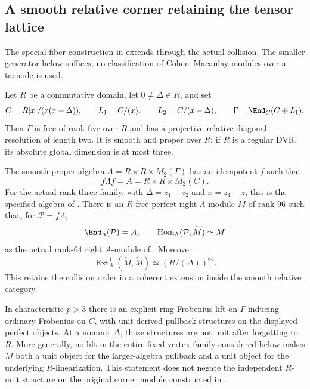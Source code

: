 \subsection{A smooth relative corner retaining the tensor lattice}
The special-fiber construction in  extends through the
actual collision. The smaller generator below suffices; no
classification of Cohen--Macaulay modules over a tacnode is used.

\begin{finding}\label{f:relativeauslander}
Let $R$ be a commutative domain, let $0\ne\Delta\in R$, and set
\[
 C=R[x]/(x(x-\Delta)),\qquad L_1=C/(x),\qquad
 L_2=C/(x-\Delta),\qquad
 \Gamma=\End_C(C\oplus L_1).
\]
Then $\Gamma$ is free of rank five over $R$ and has a projective
relative diagonal resolution of length two. It is smooth and
proper over $R$; if $R$ is a regular DVR, its absolute global
dimension is at most three.

The smooth proper algebra
$\Lambda=R\times R\times M_2(\Gamma)$ has an idempotent $f$ such that
\[
 f\Lambda f=A=R\times R\times M_2(C).
\]
For the actual rank-three family, with $\Delta=z_1-z_2$ and
$x=z_1-z$, this is the specified algebra of . There is an
$R$-free perfect right $\Lambda$-module $\widetilde M$ of rank
$96$ such that, for $\mathcal P=f\Lambda$,
\[
 \End_\Lambda(\mathcal P)=A,\qquad
 \operatorname{Hom}_\Lambda(\mathcal P,\widetilde M)
       \simeq M
\]
as the actual rank-$64$ right $A$-module of .
Moreover
\[
 \operatorname{Ext}^1_\Lambda(\widetilde M,\widetilde M)
       \simeq(R/(\Delta))^{64}.
\]
This retains the collision order in a coherent extension inside
the smooth relative category.

In characteristic $p>3$ there is an explicit ring Frobenius lift
on $\Gamma$ inducing ordinary Frobenius on $C$, with unit
derived pullback structures on the displayed perfect objects.
At a nonunit $\Delta$, those structures are not unit after
forgetting to $R$. More generally, no lift in the entire
fixed-vertex family considered below makes $\widetilde M$
both a unit object for the larger-algebra pullback and a unit
object for the underlying $R$-linearization.
This statement does not negate the independent $R$-unit
structure on the original corner module constructed in
.
\end{finding}

